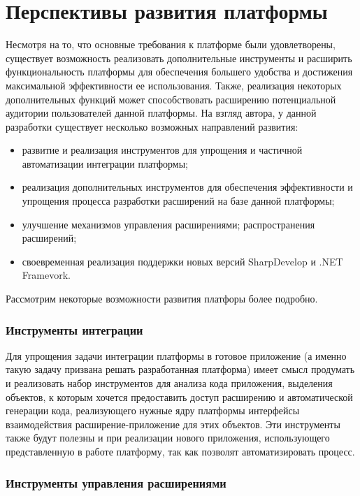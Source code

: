 \section{Перспективы развития платформы}

Несмотря на то, что основные требования к платформе были удовлетворены, существует возможность реализовать дополнительные инструменты и расширить функциональность платформы для обеспечения большего удобства и достижения максимальной эффективности ее использования. Также, реализация некоторых дополнительных функций может способствовать расширению потенциальной аудитории пользователей данной платформы. На взгляд автора, у данной разработки существует несколько возможных направлений развития:

\begin{itemize}
   \item развитие и реализация инструментов для упрощения и частичной автоматизации интеграции платформы;
   \item реализация дополнительных инструментов для обеспечения эффективности и упрощения процесса разработки расширений на базе данной платформы;
   \item улучшение механизмов управления расширениями; распространения расширений;
   \item своевременная реализация поддержки новых версий SharpDevelop и .NET Framevork.
\end{itemize}

Рассмотрим некоторые возможности развития платфоры более подробно.

\subsubsection{Инструменты интеграции}

Для упрощения задачи интеграции платформы в готовое приложение (а именно такую задачу призвана решать разработанная платформа) имеет смысл продумать и реализовать набор инструментов для анализа кода приложения, выделения объектов, к которым хочется предоставить доступ расширению и автоматической генерации кода, реализующего нужные ядру платформы интерфейсы взаимодействия расширение-приложение для этих объектов. Эти инструменты также будут полезны и при реализации нового приложения, использующего представленную в работе платформу, так как позволят автоматизировать процесс.

\subsubsection{Инструменты управления расширениями}

